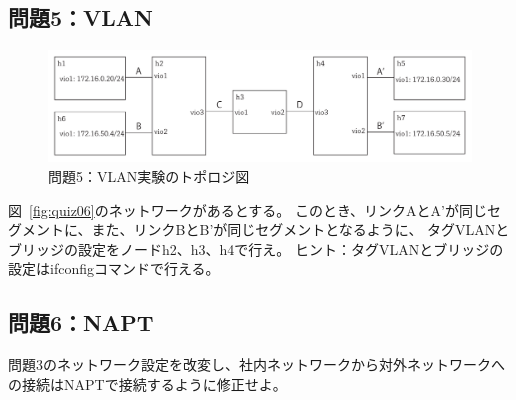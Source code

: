 \subsection{問題5：VLAN}

\begin{figure}
    \centering
    \includegraphics[width=15cm,pagebox=artbox]{figs/quiz05.pdf}
    \caption{問題5：VLAN実験のトポロジ図} \label{fig:quiz05}
\end{figure}

図~\ref{fig:quiz06}のネットワークがあるとする。
このとき、リンクAとA'が同じセグメントに、また、リンクBとB'が同じセグメントとなるように、
タグVLANとブリッジの設定をノードh2、h3、h4で行え。
ヒント：タグVLANとブリッジの設定はifconfigコマンドで行える。

\subsection{問題6：NAPT}

問題3のネットワーク設定を改変し、社内ネットワークから対外ネットワークへの接続はNAPTで接続するように修正せよ。
